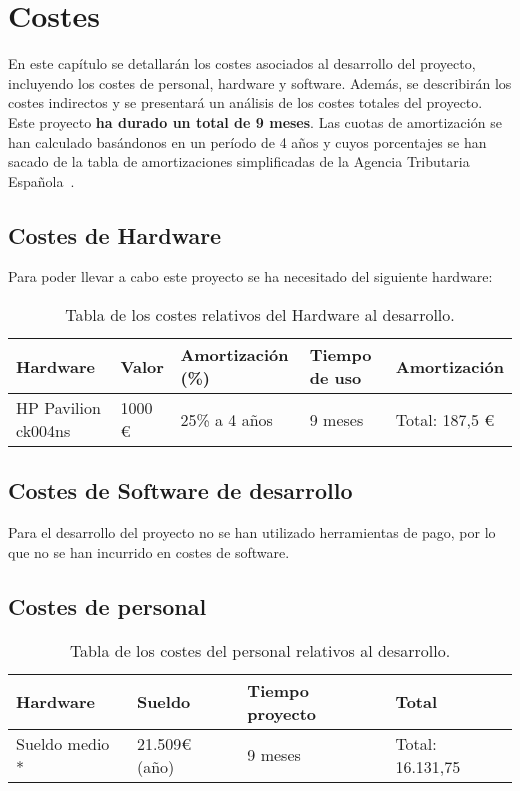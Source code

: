 \chapter{Costes}

En este capítulo se detallarán los costes asociados al desarrollo del proyecto, incluyendo los costes de personal, hardware y software. Además, se describirán los costes indirectos y se presentará un análisis de los costes totales del proyecto. Este proyecto \textbf{ha durado un total de 9 meses}. Las cuotas de amortización se han calculado basándonos en un período de 4 años y cuyos porcentajes se han sacado de la tabla de amortizaciones simplificadas de la Agencia Tributaria Española~\cite{agencia2023manual}.

\section{Costes de Hardware}

Para poder llevar a cabo este proyecto se ha necesitado del siguiente hardware:

\begin{table}[H]
  \centering
  \begin{tabular}{|l|l|l|l|l|}
    \hline
    \textbf{Hardware}   & \textbf{Valor} & \textbf{Amortización (\%)} & \textbf{Tiempo de uso} & \textbf{Amortización} \\ \hline
    HP Pavilion ck004ns & 1000 €         & 25\% a 4 años              & 9 meses                & Total: 187,5 €        \\ \hline
  \end{tabular}
  \caption{Tabla de los costes relativos del Hardware al desarrollo.}
  \label{table:1}
\end{table}

\section{Costes de Software de desarrollo}

Para el desarrollo del proyecto no se han utilizado herramientas de pago, por lo que no se han incurrido en costes de software.

\section{Costes de personal}

\begin{table}[H]
  \centering
  \begin{tabular}{|l|l|l|l|}
    \hline
    \textbf{Hardware} & \textbf{Sueldo} & \textbf{Tiempo proyecto} & \textbf{Total}   \\ \hline
    Sueldo medio *    & 21.509€ (año)   & 9 meses                  & Total: 16.131,75 \\ \hline
  \end{tabular}
  \caption{Tabla de los costes del personal relativos al desarrollo.}
  \label{table:1}
\end{table}

